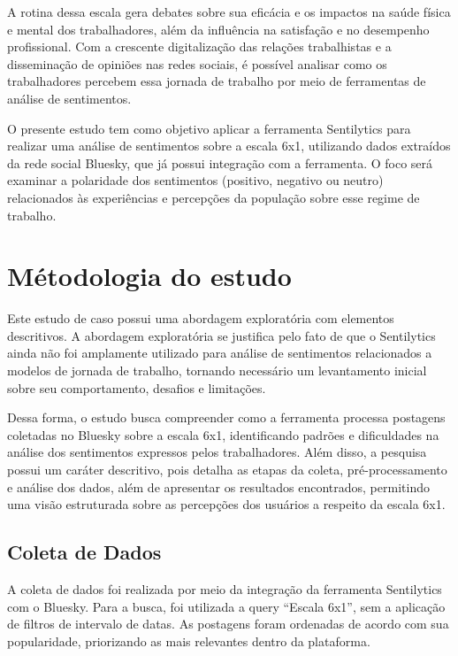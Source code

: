 \documentclass[
	12pt,				%
	oneside,			%
	a4paper,			%
	english,			%
	french,				%
	spanish,			%
	brazil				%
	]{abntex2}
\begin{document}
A rotina dessa escala gera debates sobre sua eficácia e os impactos na
saúde física e mental dos trabalhadores, além da influência na
satisfação e no desempenho profissional. Com a crescente digitalização
das relações trabalhistas e a disseminação de opiniões nas redes
sociais, é possível analisar como os trabalhadores percebem essa jornada
de trabalho por meio de ferramentas de análise de sentimentos.

O presente estudo tem como objetivo aplicar a ferramenta Sentilytics
para realizar uma análise de sentimentos sobre a escala 6x1, utilizando
dados extraídos da rede social Bluesky, que já possui integração com a
ferramenta. O foco será examinar a polaridade dos sentimentos (positivo,
negativo ou neutro) relacionados às experiências e percepções da
população sobre esse regime de trabalho.

\hypertarget{muxe9todologia-do-estudo}{%
\section{Métodologia do estudo}\label{muxe9todologia-do-estudo}}

Este estudo de caso possui uma abordagem exploratória com elementos
descritivos. A abordagem exploratória se justifica pelo fato de que o
Sentilytics ainda não foi amplamente utilizado para análise de
sentimentos relacionados a modelos de jornada de trabalho, tornando
necessário um levantamento inicial sobre seu comportamento, desafios e
limitações.

Dessa forma, o estudo busca compreender como a ferramenta processa
postagens coletadas no Bluesky sobre a escala 6x1, identificando padrões
e dificuldades na análise dos sentimentos expressos pelos trabalhadores.
Além disso, a pesquisa possui um caráter descritivo, pois detalha as
etapas da coleta, pré-processamento e análise dos dados, além de
apresentar os resultados encontrados, permitindo uma visão estruturada
sobre as percepções dos usuários a respeito da escala 6x1.

\hypertarget{coleta-de-dados}{%
\subsection{Coleta de Dados}\label{coleta-de-dados}}

A coleta de dados foi realizada por meio da integração da ferramenta
Sentilytics com o Bluesky. Para a busca, foi utilizada a query ``Escala
6x1'', sem a aplicação de filtros de intervalo de datas. As postagens
foram ordenadas de acordo com sua popularidade, priorizando as mais
relevantes dentro da plataforma.
\end{document}
